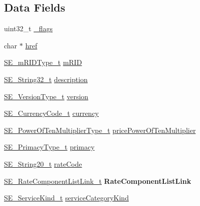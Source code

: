 \subsection*{Data Fields}
\begin{DoxyCompactItemize}
\item 
uint32\+\_\+t \hyperlink{group__TariffProfile_gaa78d09e0c7107d9a1f284ae5704cf953}{\+\_\+flags}
\item 
char $\ast$ \hyperlink{group__TariffProfile_gaed6a5a993529e6bd90753740488cf545}{href}
\item 
\hyperlink{group__mRIDType_gac74622112f3a388a2851b2289963ba5e}{S\+E\+\_\+m\+R\+I\+D\+Type\+\_\+t} \hyperlink{group__TariffProfile_ga176923870d71122bf68ca1ce65ab011c}{m\+R\+ID}
\item 
\hyperlink{group__String32_gac9f59b06b168b4d2e0d45ed41699af42}{S\+E\+\_\+\+String32\+\_\+t} \hyperlink{group__TariffProfile_gaaad6cdc4afe4bfa613d5a1b234ea195b}{description}
\item 
\hyperlink{group__VersionType_ga4b8d27838226948397ed99f67d46e2ae}{S\+E\+\_\+\+Version\+Type\+\_\+t} \hyperlink{group__TariffProfile_ga40737bc54b06a6865e6f15c4314fa4f8}{version}
\item 
\hyperlink{group__CurrencyCode_gadef02433fe757d7bd9fd0d9b59f690a0}{S\+E\+\_\+\+Currency\+Code\+\_\+t} \hyperlink{group__TariffProfile_ga30b65778dba600d5614a0ef2426a5cf8}{currency}
\item 
\hyperlink{group__PowerOfTenMultiplierType_gaf0317b781dc8dbb9cb6ac4e44a14fdef}{S\+E\+\_\+\+Power\+Of\+Ten\+Multiplier\+Type\+\_\+t} \hyperlink{group__TariffProfile_gade0e52155091cbae350b4670990fc823}{price\+Power\+Of\+Ten\+Multiplier}
\item 
\hyperlink{group__PrimacyType_ga484b22ef8ff92c8801e6a8b7bd8351eb}{S\+E\+\_\+\+Primacy\+Type\+\_\+t} \hyperlink{group__TariffProfile_gab14fe928719a93747ef7d7c85a4a86f8}{primacy}
\item 
\hyperlink{group__String20_gac62354528eb48096f8deab6e503a3193}{S\+E\+\_\+\+String20\+\_\+t} \hyperlink{group__TariffProfile_gac8e09cc332d01b111d36845abc32972e}{rate\+Code}
\item 
\hyperlink{structSE__RateComponentListLink__t}{S\+E\+\_\+\+Rate\+Component\+List\+Link\+\_\+t} {\bfseries Rate\+Component\+List\+Link}
\item 
\hyperlink{group__ServiceKind_ga19a788255c7eeda579474fc6f3cc0810}{S\+E\+\_\+\+Service\+Kind\+\_\+t} \hyperlink{group__TariffProfile_ga0a246c8cd1bc935177a2bf6aca7a328a}{service\+Category\+Kind}
\end{DoxyCompactItemize}


